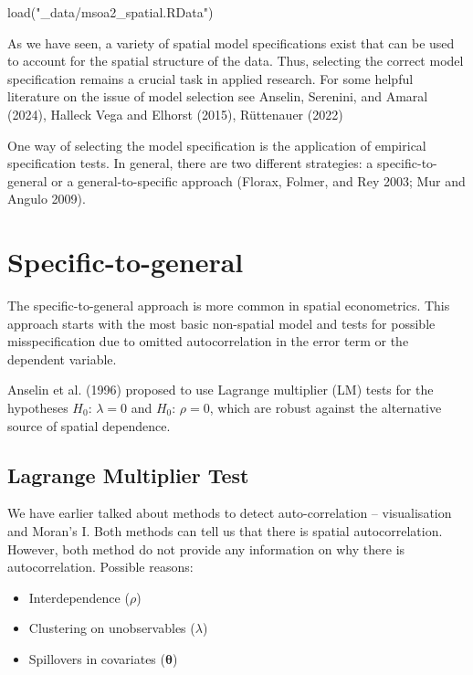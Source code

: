 \documentclass[
  letterpaper,
]{scrbook}
\newenvironment{Shaded}{\begin{snugshade}}{\end{snugshade}}
\newcommand{\FunctionTok}[1]{\textcolor[rgb]{0.28,0.35,0.67}{#1}}
\newcommand{\NormalTok}[1]{\textcolor[rgb]{0.00,0.23,0.31}{#1}}
\newcommand{\StringTok}[1]{\textcolor[rgb]{0.13,0.47,0.30}{#1}}
\providecommand{\tightlist}{%
  \setlength{\itemsep}{0pt}\setlength{\parskip}{0pt}}\usepackage{longtable,booktabs,array}
\begin{document}
\begin{Shaded}
\begin{Highlighting}[]
\FunctionTok{load}\NormalTok{(}\StringTok{"\_data/msoa2\_spatial.RData"}\NormalTok{)}
\end{Highlighting}
\end{Shaded}

As we have seen, a variety of spatial model specifications exist that
can be used to account for the spatial structure of the data. Thus,
selecting the correct model specification remains a crucial task in
applied research. For some helpful literature on the issue of model
selection see Anselin, Serenini, and Amaral (2024), Halleck Vega and
Elhorst (2015), Rüttenauer (2022)

One way of selecting the model specification is the application of
empirical specification tests. In general, there are two different
strategies: a specific-to-general or a general-to-specific approach
(Florax, Folmer, and Rey 2003; Mur and Angulo 2009).

\hypertarget{specific-to-general}{%
\section{Specific-to-general}\label{specific-to-general}}

The specific-to-general approach is more common in spatial econometrics.
This approach starts with the most basic non-spatial model and tests for
possible misspecification due to omitted autocorrelation in the error
term or the dependent variable.

Anselin et al. (1996) proposed to use Lagrange multiplier (LM) tests for
the hypotheses \(H_0\): \(\lambda=0\) and \(H_0\): \(\rho=0\), which are
robust against the alternative source of spatial dependence.

\hypertarget{lagrange-multiplier-test}{%
\subsection{Lagrange Multiplier Test}\label{lagrange-multiplier-test}}

We have earlier talked about methods to detect auto-correlation --
visualisation and Moran's I. Both methods can tell us that there is
spatial autocorrelation. However, both method do not provide any
information on why there is autocorrelation. Possible reasons:

\begin{itemize}
\tightlist
\item
  Interdependence (\(\rho\))
\item
  Clustering on unobservables (\(\lambda\))
\item
  Spillovers in covariates (\(\boldsymbol{\mathbf{\theta}}\))
\end{itemize}
\end{document}
